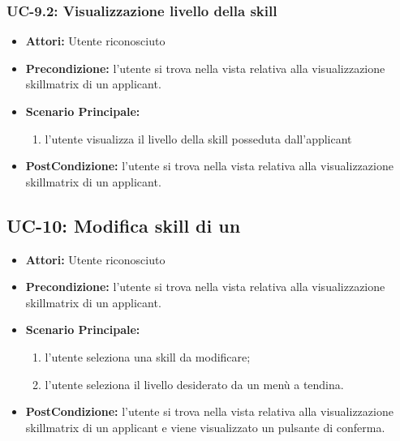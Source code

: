 \subsubsection{UC-9.2: Visualizzazione livello della skill}
\begin{itemize}
	\item \textbf{Attori:} Utente riconosciuto
	\item \textbf{Precondizione:}  l'utente si trova nella vista relativa alla visualizzazione skillmatrix di un applicant.
	\item \textbf{Scenario Principale:}
	\begin{enumerate}
		\item l'utente visualizza il livello della skill posseduta dall'applicant
	\end{enumerate}
	\item \textbf{PostCondizione:}  l'utente si trova nella vista relativa alla visualizzazione skillmatrix di un applicant.
\end{itemize}



\subsection{UC-10: Modifica skill di un \applicant}
\begin{itemize}
\item \textbf{Attori:} Utente riconosciuto
\item \textbf{Precondizione:} l'utente si trova nella vista relativa alla visualizzazione skillmatrix di un applicant.
\item \textbf{Scenario Principale:}
\begin{enumerate}
	\item l'utente seleziona una skill da modificare;
	\item l'utente seleziona il livello desiderato da un menù a tendina.
\end{enumerate}
\item \textbf{PostCondizione:} l'utente si trova nella vista relativa alla visualizzazione skillmatrix di un applicant e viene visualizzato un pulsante di conferma.
\end{itemize}

